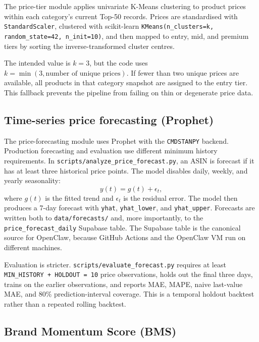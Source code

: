 The price-tier module applies univariate K-Means clustering to product
prices within each category's current Top-50 records. Prices are
standardised with \texttt{StandardScaler}, clustered with scikit-learn
\texttt{KMeans(n\_clusters=k, random\_state=42, n\_init=10)}, and then
mapped to entry, mid, and premium tiers by sorting the inverse-transformed
cluster centres.

The intended value is $k=3$, but the code uses
$k=\min(3,\text{number of unique prices})$. If fewer than two unique
prices are available, all products in that category snapshot are assigned
to the entry tier. This fallback prevents the pipeline from failing on
thin or degenerate price data.

\subsection{Time-series price forecasting (Prophet)}

The price-forecasting module uses Prophet with the \texttt{CMDSTANPY}
backend. Production forecasting and evaluation use different minimum
history requirements. In \texttt{scripts/analyze\_price\_forecast.py},
an ASIN is forecast if it has at least three historical price points. The
model disables daily, weekly, and yearly seasonality:
\begin{equation}
    y(t) = g(t) + \epsilon_t,
\end{equation}
where $g(t)$ is the fitted trend and $\epsilon_t$ is the residual error.
The model then produces a 7-day forecast with \texttt{yhat},
\texttt{yhat\_lower}, and \texttt{yhat\_upper}. Forecasts are written both
to \texttt{data/forecasts/} and, more importantly, to the
\texttt{price\_forecast\_daily} Supabase table. The Supabase table is the
canonical source for OpenClaw, because GitHub Actions and the OpenClaw VM
run on different machines.

Evaluation is stricter. \texttt{scripts/evaluate\_forecast.py} requires
at least \texttt{MIN\_HISTORY + HOLDOUT = 10} price observations, holds
out the final three days, trains on the earlier observations, and reports
MAE, MAPE, naive last-value MAE, and 80\% prediction-interval coverage.
This is a temporal holdout backtest rather than a repeated rolling
backtest.

\subsection{Brand Momentum Score (BMS)}

